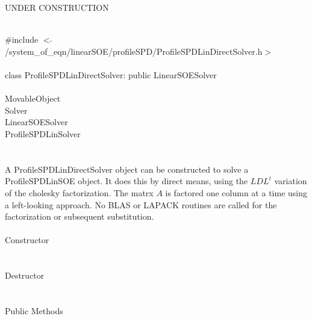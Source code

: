 
UNDER CONSTRUCTION

   \\
\indent \#include $<\tilde{
}$/system\_of\_eqn/linearSOE/profileSPD/ProfileSPDLinDirectSolver.h$>$
\\ 

  \\
\indent class ProfileSPDLinDirectSolver: public LinearSOESolver  \\

 \\
\indent MovableObject \\
\indent\indent  Solver \\
\indent\indent\indent LinearSOESolver \\
\indent\indent\indent\indent ProfileSPDLinSolver \\
\indent\indent\indent\indent{} \\

  \\
\indent A ProfileSPDLinDirectSolver object can be constructed to solve
a ProfileSPDLinSOE object. It does this by direct means, using the
$LDL^t$ variation of the cholesky factorization. The matrx $A$ is
factored one column at a time using a left-looking approach. No BLAS
or LAPACK routines are called for the factorization or subsequent
substitution. \\ 

  \\
\indent\indent Constructor \\
\indent{}  \\ \\
\indent\indent Destructor \\
\indent{}\\  \\
\indent\indent Public Methods \\
\indent{} \\
\indent{} \\
\indent{}\\ 
\indent{}\\ 


